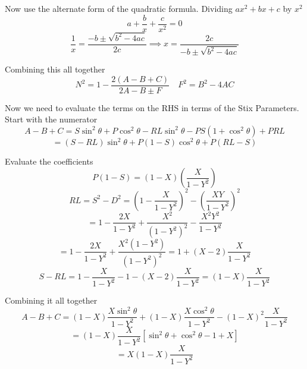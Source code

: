 Now use the alternate form of the quadratic formula. Dividing $ax^2 + bx + c$ by $x^2$
\begin{equation*}
	a + \frac{b}{x} + \frac{c}{x^2} = 0
\end{equation*}
\begin{equation*}
	\frac{1}{x} = \frac{-b \pm \sqrt{b^2 - 4ac}}{2c} \implies x = \frac{2c}{-b \pm \sqrt{b^2 - 4ac}}
\end{equation*}

Combining this all together
\begin{equation} \label{ap_raw}
	N^2 = 1 - \frac{2(A - B + C)}{2A - B \pm F} \quad F^2 = B^2 - 4AC
\end{equation}

Now we need to evaluate the terms on the RHS in terms of the Stix Parameters. Start with the numerator
\begin{equation*}
	A - B + C = S \sin^2 \theta + P \cos^2 \theta - RL \sin^2 \theta - PS \left( 1 + \cos^2 \theta \right) + PRL
\end{equation*}
\begin{equation}
	= \left( S - RL \right) \sin^2 \theta + P \left( 1 - S \right) \cos^2 \theta + P \left( RL - S \right)
\end{equation}

Evaluate the coefficients
\begin{equation}
	P \left( 1 - S \right) = \left( 1 - X \right)  \left( \frac{X}{1 - Y^2} \right)
\end{equation}
\begin{equation*}
	RL = S^2 - D^2 = \left( 1 - \frac{X}{1 - Y^2} \right)^2 - \left( \frac{XY}{1 - Y^2} \right)^2
\end{equation*}
\begin{equation*}
	= 1 - \frac{2X}{1 - Y^2} + \frac{X^2}{\left( 1 - Y^2 \right)^2} - \frac{ X^2 Y^2 }{ 1 - Y^2 }
\end{equation*}
\begin{equation}
	= 1 - \frac{2X}{1 - Y^2} + \frac{X^2 \left( 1 - Y^2 \right)}{\left( 1 - Y^2 \right)^2} = 1 + \left( X - 2 \right) \frac{X}{1 - Y^2}
\end{equation}
\begin{equation}
	S - RL = 1 - \frac{X}{1 - Y^2} - 1 - \left( X - 2 \right) \frac{X}{1 - Y^2} = \left( 1 - X \right) \frac{X}{1 - Y^2}
\end{equation}

Combining it all together
\begin{equation*}
	A - B + C = \left( 1 - X \right) \frac{X \sin^2 \theta }{1 - Y^2} + \left( 1 - X \right) \frac{X \cos^2 \theta }{1 - Y^2} - \left( 1 - X \right)^2 \frac{X}{1 - Y^2}
\end{equation*}
\begin{equation*}
	= \left( 1 - X \right) \frac{X}{1 - Y^2} \left[ \sin^2 \theta + \cos^2 \theta - 1 + X \right]
\end{equation*}
\begin{equation}
	= X \left( 1 - X \right) \frac{X}{1 - Y^2}
\end{equation}

